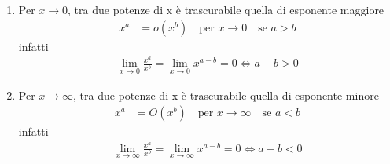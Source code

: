 \documentclass{book}
\begin{document}
\begin{enumerate}[label=\roman*., start=1]
  \item Per \(x \to 0\), tra due potenze di x è trascurabile quella di esponente maggiore
        \begin{align*}
          x^a & = o(x^b) \quad \text{per } x \to 0 \quad \text{se } a > b
        \end{align*}
        infatti
        \begin{align*}
          \lim_{x \to 0} \frac{x^a}{x^b} = \lim_{x \to 0} x^{a-b} = 0 \iff a-b>0
        \end{align*}

  \item Per \(x \to \infty\), tra due potenze di x è trascurabile quella di esponente minore
        \begin{align*}
          x^a & = O(x^b) \quad \text{per } x \to \infty \quad \text{se } a < b
        \end{align*}
        infatti
        \begin{align*}
          \lim_{x \to \infty} \frac{x^a}{x^b} = \lim_{x \to \infty} x^{a-b} = 0 \iff a-b<0
        \end{align*}
\end{enumerate}
\end{document}
